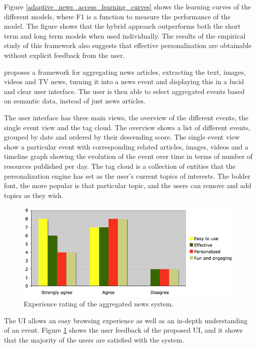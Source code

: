 Figure \ref{adaptive_news_access_learning_curves} shows the learning curves of the different models, where F1 is a function to measure the performance of the model. The figure shows that the hybrid approach outperforms both the short term and long term models when used individually. The results of the empirical study of this framework also suggests that effective personalization are obtainable without explicit feedback from the user.




\cite{rohr2008aggregated} proposes a framework for aggregating news articles, extracting the text, images, videos and TV news, turning it into a news event and displaying this in a lucid and clear user interface. The user is then able to select aggregated events based on semantic data, instead of just news articles.

The user interface has three main views, the overview of the different events, the single event view and the tag cloud. The overview shows a list of different events, grouped by date and ordered by their descending score. The single event view show a particular event with corresponding related articles, images, videos and a timeline graph showing the evolution of the event over time in terms of number of resources published per day. The tag cloud is a collection of entities that the personalization engine has set as the user's current topics of interests. The bolder font, the more popular is that particular topic, and the users can remove and add topics as they wish.

\begin{figure}[!htbp]
\centering
\includegraphics[width=130mm]{GFX/tech/aggregatedExpRating.png}
\caption{Experience rating of the aggregated news system.}
\label{aggregated_news_system_exp_rating}
\end{figure}

The UI allows an easy browsing experience as well as an in-depth understanding of an event. Figure \ref{aggregated_news_system_exp_rating} shows the user feedback of the proposed UI, and it shows that the majority of the users are satisfied with the system.




